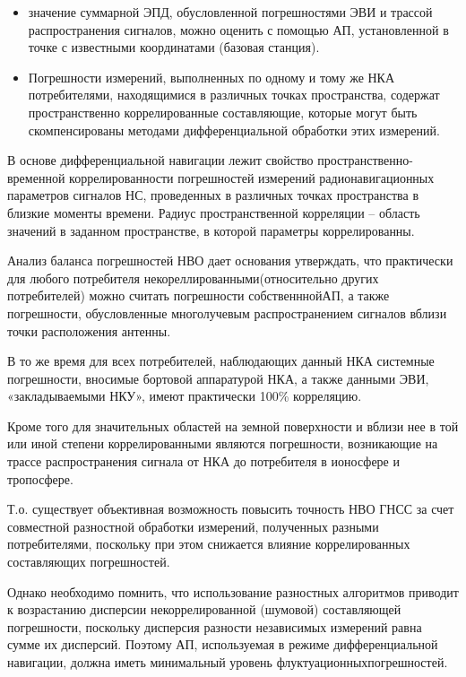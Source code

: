 \documentclass[14pt,a4paper,oneside]{extarticle}
\begin{document}
\begin{itemize}
    \item значение суммарной ЭПД, обусловленной погрешностями ЭВИ и трассой распространения сигналов, можно оценить с помощью АП, установленной в точке с известными координатами (базовая станция).
    \item Погрешности измерений, выполненных по одному и тому же НКА потребителями, находящимися в различных точках пространства, содержат пространственно коррелированные составляющие, которые могут быть скомпенсированы методами дифференциальной обработки этих измерений.
\end{itemize}

В основе дифференциальной навигации лежит свойство пространственно-временной коррелированности погрешностей измерений радионавигационных параметров сигналов НС, проведенных в различных точках пространства в близкие моменты времени.
Радиус пространственной корреляции – область значений в заданном пространстве, в которой параметры коррелированны.

Анализ баланса погрешностей НВО дает основания утверждать, что практически для любого потребителя некореллированными(относительно других потребителей) можно считать погрешности собственннойАП, а также погрешности, обусловленные многолучевым распространением сигналов вблизи точки расположения антенны.

В то же время для всех потребителей, наблюдающих данный НКА системные погрешности, вносимые бортовой аппаратурой НКА, а также данными ЭВИ, «закладываемыми НКУ», имеют практически 100\% корреляцию.

Кроме того для значительных областей на земной поверхности и вблизи нее в той или иной степени коррелированными являются погрешности, возникающие на трассе распространения сигнала от НКА до потребителя в ионосфере и тропосфере.

Т.о. существует объективная возможность повысить точность НВО ГНСС за счет совместной разностной обработки измерений, полученных разными потребителями, поскольку при этом снижается влияние коррелированных составляющих погрешностей.

Однако необходимо помнить, что использование разностных алгоритмов приводит к возрастанию дисперсии некоррелированной (шумовой) составляющей погрешности, поскольку дисперсия разности независимых измерений равна сумме их дисперсий. Поэтому АП, используемая в режиме дифференциальной навигации, должна иметь минимальный уровень флуктуационныхпогрешностей.
\end{document}

